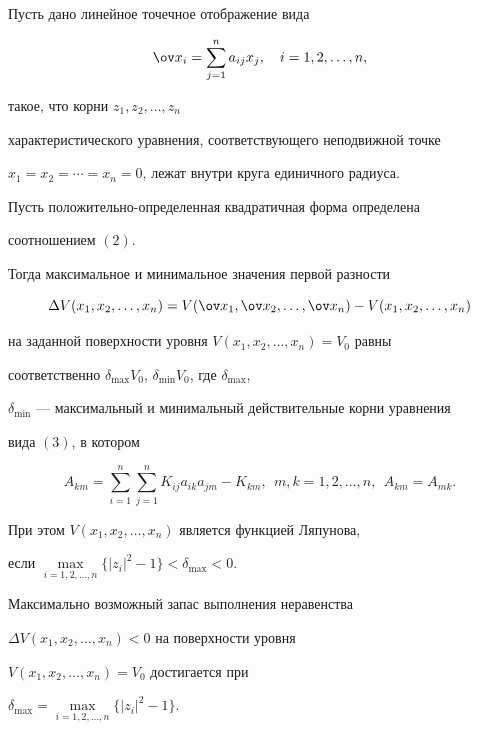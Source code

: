 \begin{thm}


Пусть дано линейное точечное отображение вида


$$


\ov x_{i}=\sum_{j=1}^{n} a_{ij}x_{j},\quad i=1,2,\dotsc,n,


$$


такое, что корни $z_{1},z_{2},\dotsc,z_{n}$


характеристического уравнения, соответствующего неподвижной точке


$x_{1}=x_{2}=\dotsb =x_{n}=0$, лежат внутри круга единичного радиуса.


Пусть по\-ло\-жи\-тель\-но-определенная квадратичная форма определена


соотношением $(2)$.


Тогда максимальное и минимальное значения первой разности


$$


\Delta V(x_{1},x_{2},\dotsc,x_{n})=


V(\ov x_{1},\ov x_{2},\dotsc,\ov x_{n})-


V(x_{1},x_{2},\dotsc,x_{n})


$$


на заданной поверхности уровня $V(x_{1},x_{2},\dotsc,x_{n})=V_{0}$ равны


соответственно $\delta_{\max}V_{0}$, $\delta_{\min}V_{0}$, где $\delta_{\max}$,


$\delta_{\min}$ --- максимальный и минимальный действительные корни уравнения


вида $(3)$, в котором 


$$


A_{km}=\sum_{i=1}^{n}\sum_{j=1}^{n} K_{ij}a_{ik}a_{jm}-K_{km},\ \ 


m,k=1,2,\dotsc,n, \ \ A_{km}=A_{mk}.


$$


При этом $V(x_{1},x_{2},\dotsc,x_{n})$ является функцией Ляпунова,


если $\max\limits_{i=1,2,\dotsc,n} \{|z_{i}|^{2}-1\} <\delta_{\max}<0$.


Максимально возможный запас выполнения неравенства


$\Delta V(x_{1},x_{2},\dotsc,x_{n})<0$ на поверхности уровня


$V(x_{1},x_{2},\dotsc,x_{n})=V_{0}$ достигается при


$\delta_{\max}=\max\limits_{i=1,2,\dotsc,n} \{|z_{i}|^{2} -1 \}$.


\end{thm}





